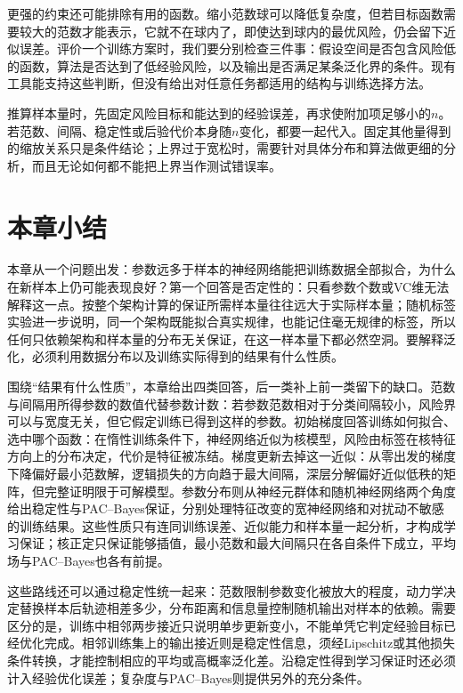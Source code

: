 更强的约束还可能排除有用的函数。缩小范数球可以降低复杂度，但若目标函数需要较大的范数才能表示，它就不在球内了，即使达到球内的最优风险，仍会留下近似误差。评价一个训练方案时，我们要分别检查三件事：假设空间是否包含风险低的函数，算法是否达到了低经验风险，以及输出是否满足某条泛化界的条件。现有工具能支持这些判断，但没有给出对任意任务都适用的结构与训练选择方法。

推算样本量时，先固定风险目标和能达到的经验误差，再求使附加项足够小的$n$。若范数、间隔、稳定性或后验代价本身随$n$变化，都要一起代入。固定其他量得到的缩放关系只是条件结论；上界过于宽松时，需要针对具体分布和算法做更细的分析，而且无论如何都不能把上界当作测试错误率。

\FloatBarrier
{}
\section{本章小结}
\label{sec:deep-learning-summary}

本章从一个问题出发：参数远多于样本的神经网络能把训练数据全部拟合，为什么在新样本上仍可能表现良好？第一个回答是否定性的：只看参数个数或VC维无法解释这一点。按整个架构计算的保证所需样本量往往远大于实际样本量；随机标签实验进一步说明，同一个架构既能拟合真实规律，也能记住毫无规律的标签，所以任何只依赖架构和样本量的分布无关保证，在这一样本量下都必然空洞。要解释泛化，必须利用数据分布以及训练实际得到的结果有什么性质。

围绕“结果有什么性质”，本章给出四类回答，后一类补上前一类留下的缺口。范数与间隔用所得参数的数值代替参数计数：若参数范数相对于分类间隔较小，风险界可以与宽度无关，但它假定训练已得到这样的参数。初始梯度回答训练如何拟合、选中哪个函数：在惰性训练条件下，神经网络近似为核模型，风险由标签在核特征方向上的分布决定，代价是特征被冻结。梯度更新去掉这一近似：从零出发的梯度下降偏好最小范数解，逻辑损失的方向趋于最大间隔，深层分解偏好近似低秩的矩阵，但完整证明限于可解模型。参数分布则从神经元群体和随机神经网络两个角度给出稳定性与PAC--Bayes保证，分别处理特征改变的宽神经网络和对扰动不敏感的训练结果。这些性质只有连同训练误差、近似能力和样本量一起分析，才构成学习保证；核正定只保证能够插值，最小范数和最大间隔只在各自条件下成立，平均场与PAC--Bayes也各有前提。

这些路线还可以通过稳定性统一起来：范数限制参数变化被放大的程度，动力学决定替换样本后轨迹相差多少，分布距离和信息量控制随机输出对样本的依赖。需要区分的是，训练中相邻两步接近只说明单步更新变小，不能单凭它判定经验目标已经优化完成。相邻训练集上的输出接近则是稳定性信息，须经Lipschitz或其他损失条件转换，才能控制相应的平均或高概率泛化差。沿稳定性得到学习保证时还必须计入经验优化误差；复杂度与PAC--Bayes则提供另外的充分条件。

